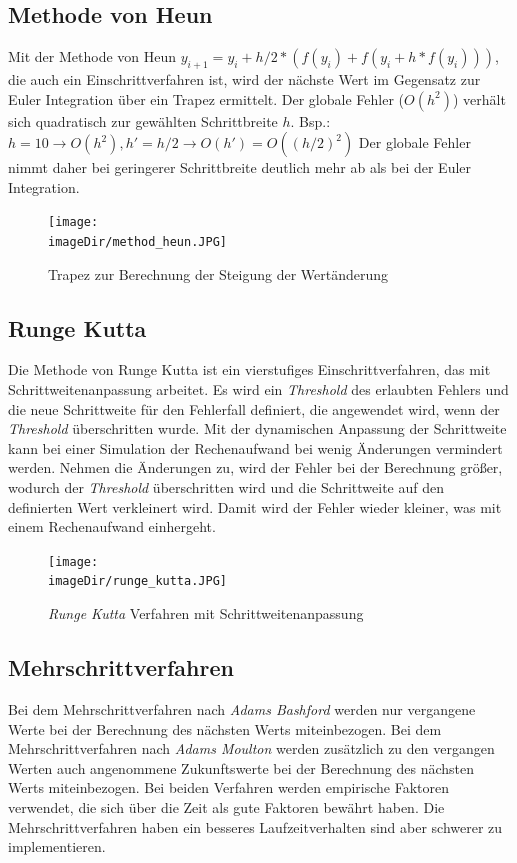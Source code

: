\documentclass[11pt, a4paper, twoside]{article}   	%
\newcommand{\imageDir}{./images/}
\begin{document}
\subsection{Methode von Heun}
Mit der Methode von Heun $y_{i+1}=y_i+h/2*(f(y_i) + f(y_i+h*f(y_i)))$, die auch ein Einschrittverfahren ist, wird der nächste Wert im Gegensatz zur Euler Integration über ein Trapez ermittelt. Der globale Fehler ($O(h^2)$) verhält sich quadratisch zur gewählten Schrittbreite $h$. 
\newline
\newline
Bsp.: $h=10 \rightarrow O(h^2), h'=h/2 \rightarrow O(h')=O((h/2)^2)$
\newline
\newline
Der globale Fehler nimmt daher bei geringerer Schrittbreite deutlich mehr ab als bei der Euler Integration.

\begin{figure}[h]
\centering
\texttt{[image: \\imageDir/method\_heun.JPG]}
\caption{Trapez zur Berechnung der Steigung der Wertänderung}
\label{fig:euler-integration}
\end{figure}

\subsection{Runge Kutta}
Die Methode von Runge Kutta ist ein vierstufiges Einschrittverfahren, das mit Schrittweitenanpassung arbeitet. Es wird ein \emph{Threshold} des erlaubten Fehlers und die neue Schrittweite für den Fehlerfall definiert, die angewendet wird, wenn der \emph{Threshold}  überschritten wurde. Mit der dynamischen Anpassung der Schrittweite kann bei einer Simulation der Rechenaufwand bei wenig Änderungen vermindert werden. Nehmen die Änderungen zu, wird der Fehler bei der Berechnung größer, wodurch der \emph{Threshold} überschritten wird und die Schrittweite auf den definierten Wert verkleinert wird. Damit wird der Fehler wieder kleiner, was mit einem Rechenaufwand einhergeht.
\newpage

\begin{figure}[h]
\centering
\texttt{[image: \\imageDir/runge\_kutta.JPG]}
\caption{\emph{Runge Kutta} Verfahren mit Schrittweitenanpassung}
\label{fig:euler-integration}
\end{figure}

\subsection{Mehrschrittverfahren}
Bei dem Mehrschrittverfahren nach \emph{Adams Bashford} werden nur vergangene Werte bei der Berechnung des nächsten Werts miteinbezogen. Bei dem Mehrschrittverfahren nach \emph{Adams Moulton} werden zusätzlich zu den vergangen Werten auch angenommene Zukunftswerte bei der Berechnung des nächsten Werts miteinbezogen. Bei beiden Verfahren werden empirische Faktoren verwendet, die sich über die Zeit als gute Faktoren bewährt haben. Die Mehrschrittverfahren haben ein besseres Laufzeitverhalten sind aber schwerer zu implementieren.
\end{document}
